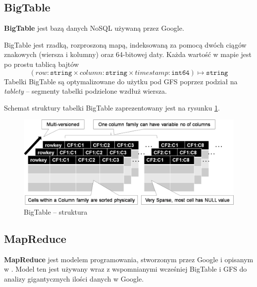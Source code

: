 \documentclass[10pt,twocolumn]{llncs}          %
\begin{document}
\subsection{BigTable}
\label{ssub:bigtable}
\textbf{BigTable} jest bazą danych NoSQL używaną przez Google. 

BigTable jest rzadką, rozproszoną mapą, indeksowaną za pomocą dwóch ciągów znakowych (wiersza i kolumny) oraz 64-bitowej daty. Każda wartość w mapie jest po prostu tablicą bajtów
$$(row: \texttt{string} \times column: \texttt{string} \times timestamp: \texttt{int64}) \mapsto \texttt{string}$$
Tabelki BigTable są optymalizowane do użytku pod GFS poprzez podział na \textit{tablety} -- segmenty tabelki podzielone wzdłuż wiersza.

Schemat struktury tabelki BigTable zaprezentowany jest na rysunku \ref{fig:google:big-table}.


\begin{figure}
    \centerline{\includegraphics[scale=0.75]{obrazki/big-table.png}}
    \caption{BigTable -- struktura}
    \label{fig:google:big-table}       %
\end{figure}

\subsection{MapReduce}
\label{ssub:mapreduce}
\textbf{MapReduce} jest modelem programowania, stworzonym przez Google i opisanym w \cite{dean08}. Model ten jest używany wraz z wspomnianymi wcześniej BigTable i GFS do analizy gigantycznych ilości danych w Google.
\end{document}
